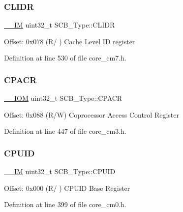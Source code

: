 \subsubsection{\texorpdfstring{C\+L\+I\+DR}{CLIDR}}
{\footnotesize\ttfamily \hyperlink{core__sc300_8h_a4cc1649793116d7c2d8afce7a4ffce43}{\+\_\+\+\_\+\+IM} uint32\+\_\+t S\+C\+B\+\_\+\+Type\+::\+C\+L\+I\+DR}

Offset\+: 0x078 (R/ ) Cache Level ID register 

Definition at line 530 of file core\+\_\+cm7.\+h.

\mbox{\label{struct_s_c_b___type_ac6a860c1b8d8154a1f00d99d23b67764}} 
\subsubsection{\texorpdfstring{C\+P\+A\+CR}{CPACR}}
{\footnotesize\ttfamily \hyperlink{core__sc300_8h_ab6caba5853a60a17e8e04499b52bf691}{\+\_\+\+\_\+\+I\+OM} uint32\+\_\+t S\+C\+B\+\_\+\+Type\+::\+C\+P\+A\+CR}

Offset\+: 0x088 (R/W) Coprocessor Access Control Register 

Definition at line 447 of file core\+\_\+cm3.\+h.

\mbox{\label{struct_s_c_b___type_a21e08d546d8b641bee298a459ea73e46}} 
\subsubsection{\texorpdfstring{C\+P\+U\+ID}{CPUID}}
{\footnotesize\ttfamily \hyperlink{core__sc300_8h_a4cc1649793116d7c2d8afce7a4ffce43}{\+\_\+\+\_\+\+IM} uint32\+\_\+t S\+C\+B\+\_\+\+Type\+::\+C\+P\+U\+ID}

Offset\+: 0x000 (R/ ) C\+P\+U\+ID Base Register 

Definition at line 399 of file core\+\_\+cm0.\+h.

\mbox{\label{struct_s_c_b___type_ad3884e8b6504ec63c1eaa8742e94df3d}} 
